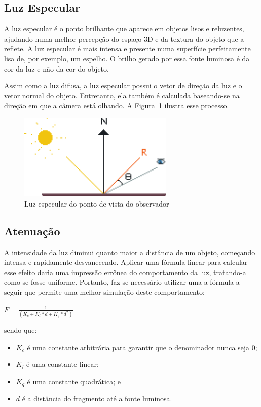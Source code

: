 \documentclass[12pt, 
openright, 
oneside, 
a4paper,    
brazil]{facom-ufu-abntex2}
\begin{document}
\subsection{Luz Especular}
A luz especular é o ponto brilhante que aparece em objetos lisos e reluzentes, ajudando numa melhor percepção do espaço 3D e da textura do objeto que a reflete. A luz especular é mais intensa e presente numa superfície perfeitamente lisa de, por exemplo, um espelho. O brilho gerado por essa fonte luminosa é da cor da luz e não da cor do objeto.

Assim como a luz difusa, a luz especular possui o vetor de direção da luz e o vetor normal do objeto. Entretanto, ela também é calculada baseando-se na direção em que a câmera está olhando. A Figura~\ref{fig:specularLight} ilustra esse processo.


\begin{figure}[H]
	\centering
	\includegraphics[width=20em]{imagens/specular.png}
	\caption{Luz especular do ponto de vista do observador}
	\label{fig:specularLight}
\end{figure}

\subsection{Atenuação}
A intensidade da luz diminui quanto maior a distância de um objeto, começando intensa e rapidamente desvanecendo. Aplicar uma fórmula linear para calcular esse efeito daria uma impressão errônea do comportamento da luz, tratando-a como se fosse uniforme. Portanto, faz-se necessário utilizar uma a fórmula a seguir que permite uma melhor simulação deste comportamento:

\begin{center}
$F = \frac{1} {(K_c + K_l * d + K_q * d^2)}$
\end{center}
\noindent 
sendo que:
\begin{itemize}
\setlength{\itemsep}{-0.1cm}
    \item $K_c$ é uma constante arbitrária para garantir que o denominador nunca seja 0;
     \item $K_l$ é uma constante linear;
     \item $K_q$ é uma constante quadrática; e
     \item $d$ é a distância do fragmento até a fonte luminosa.
\end{itemize}
\end{document}
